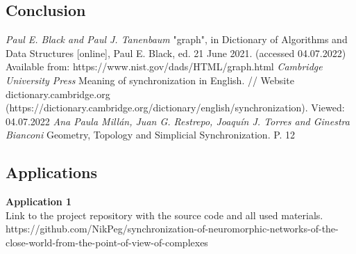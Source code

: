 \documentclass[draft]{article}
\newcommand\zz[1]{\par{\normalsize\strut #1} \hfill\ignorespaces}
\begin{document}
\newpage
\begin{center}
\section {Conclusion}
\end{center}

\newpage
\begin{center}
\begin{thebibliography}{}
 \textit{Paul E. Black and Paul J. Tanenbaum} "graph", in Dictionary of Algorithms and Data Structures [online], Paul E. Black, ed. 21 June 2021. (accessed 04.07.2022) Available from: https://www.nist.gov/dads/HTML/graph.html
 \textit{Cambridge University Press} Meaning of synchronization in English. // Website dictionary.cambridge.org (https://dictionary.cambridge.org/dictionary/english/synchronization). Viewed: 04.07.2022
 \textit{Ana Paula Millán, Juan G. Restrepo, Joaquín J. Torres and Ginestra Bianconi} Geometry, Topology and Simplicial Synchronization. P. 12
\end{thebibliography}
\end{center}
\newpage
\begin{center}
\section {Applications}
\end{center}
\zz{}\textbf{Application 1\\}
Link to the project repository with the source code and all used materials.\\
https://github.com/NikPeg/synchronization-of-neuromorphic-networks-of-the-close-world-from-the-point-of-view-of-complexes\\
\end{document}
